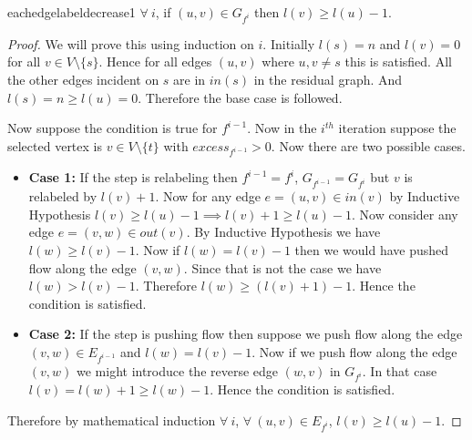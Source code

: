 \begin{lemma}{}{eachedgelabeldecrease1}
	$\forall\ i$, if $(u,v)\in G_{f^i}$ then $l(v)\geq l(u)-1$.
\end{lemma}
\begin{proof}
	We will prove this using induction on $i$. Initially $l(s)=n$ and $l(v)=0$ for all $v\in V\setminus\{s\}$. Hence for all edges $(u,v)$ where $u,v\neq s$ this is satisfied. All the other edges incident on $s$ are in $\textit{in}(s)$ in the residual graph. And $l(s)=n\geq l(u)=0$. Therefore the base case is followed.

	Now suppose the condition is true for $f^{i-1}$. Now in the $i^{th}$ iteration   suppose the selected vertex is $v\in V\setminus\{t\}$ with $\textit{excess}_{f^{i-1}}>0$. Now there are two possible cases.\begin{itemize}[label=$\bullet$]
		\item \textbf{Case 1:} If the step is relabeling then $f^{i-1}=f^i$, $G_{f^{i-1}}=G_{f^i}$ but $v$ is relabeled by $l(v)+1$. Now for any edge $e=(u,v)\in \textit{in}(v)$ by Inductive Hypothesis $l(v)\geq l(u)-1\implies l(v)+1\geq l(u)-1$. Now consider any edge $e=(v,w)\in \textit{out}(v)$.  By Inductive Hypothesis we have $l(w)\geq l(v)-1$. Now if $l(w)=l(v)-1$ then we would have pushed flow along the edge $(v,w)$. Since that is not the case we have $l(w)>l(v)-1$. Therefore $l(w)\geq (l(v)+1)-1$. Hence the condition is satisfied.
		\item \textbf{Case 2:} If the step is pushing flow then suppose we push flow along the edge $(v,w)\in E_{f^{i-1}}$ and $l(w)=l(v)-1$. Now if we push flow along the edge $(v,w)$ we might introduce the reverse edge $(w,v)$ in $G_{f^i}$. In that case $l(v)=l(w)+1\geq l(w)-1$. Hence the condition is satisfied.
	\end{itemize}
	Therefore by mathematical induction $\forall\ i$, $\forall \ (u,v)\in E_{f^i}$, $l(v)\geq l(u)-1$.
\end{proof}

